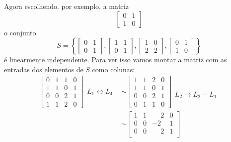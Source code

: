 \begin{exemplos}
\begin{solucao}
\begin{enumerate}
        Agora escolhendo. por exemplo, a matriz
        \[
          \begin{bmatrix}
            0 & 1\\
            1 & 0
          \end{bmatrix}
        \]
        o conjunto
        \[
          S = \left\{\begin{bmatrix}0 & 1\\0 & 1\end{bmatrix}, \begin{bmatrix}1 & 1\\0 & 1\end{bmatrix}, \begin{bmatrix}1 & 0\\2 & 2\end{bmatrix}, \begin{bmatrix}0 & 1\\1 & 0\end{bmatrix}\right\}
        \]
        é linearmente independente. Para ver isso vamos montar a matriz com as entradas dos elementos de $S$ como colunas:
        \begin{align*}
          \begin{bmatrix}
            0 & 1 & 1 & 0\\
            1 & 1 & 0 & 1\\
            0 & 0 & 2 & 1\\
            1 & 1 & 2 & 0
          \end{bmatrix}
          \begin{array}{l}
            L_1 \leftrightarrow L_4
          \end{array}&\sim
          \begin{bmatrix}
            1 & 1 & 2 & 0\\
            1 & 1 & 0 & 1\\
            0 & 0 & 2 & 1\\
            0 & 1 & 1 & 0
          \end{bmatrix}
          \begin{array}{l}
            \phantom{x}\\L_2 \to L_2 - L_1
          \end{array}\\&\sim
          \begin{bmatrix}
            1 & 1 & \phantom{-} 2 & 0\\
            0 & 0 & -2 & 1\\
            0 & 0 & \phantom{-} 2 & 1\\

\end{bmatrix}
\end{align*}
\end{enumerate}
\end{solucao}
\end{exemplos}
